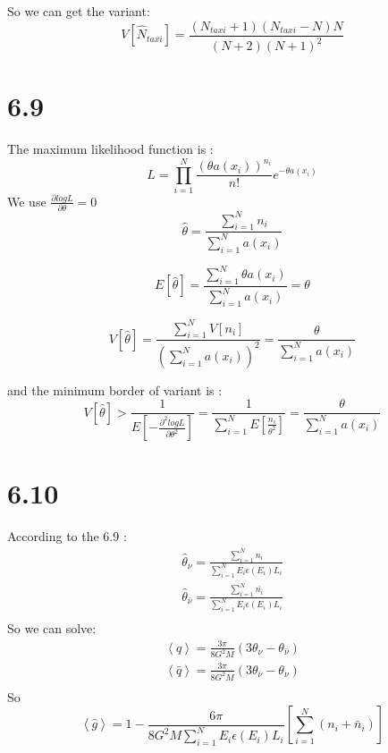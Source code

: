 \documentclass{article}
\begin{document}
\begin{CJK*}{GBK}{song}
 So we can get the variant:
 \begin{equation}
 V[\hat{N}_{taxi}]=\frac{(N_{taxi}+1)(N_{taxi}-N)N}{(N+2)(N+1)^2}
 \end{equation}
 
 
 
 \section{6.9}
 
 The maximum likelihood function is :
 \begin{equation}
 L=\prod_{i=1}^N\frac{(\theta a(x_i))^{n_i}}{n!}e^{-\theta a(x_i)}
 \end{equation}
 We use $\frac{\partial logL}{\partial \theta}=0$
 \begin{equation}
 \hat{\theta}=\frac{\sum_{i=1}^Nn_i}{\sum_{i=1}^Na(x_i)}
 \end{equation}
 
  \begin{equation}
 E[\hat{\theta}]=\frac{\sum_{i=1}^N\theta a(x_i)}{\sum_{i=1}^Na(x_i)}=\theta
 \end{equation}

  \begin{equation}
 V[\hat{\theta}]=\frac{\sum_{i=1}^NV[n_i]}{(\sum_{i=1}^Na(x_i))^2}=\frac{\theta}{\sum_{i=1}^Na(x_i)}
 \end{equation}
 
 and the minimum border of variant is :
 \begin{equation}
 V[\hat{\theta}]>\frac{1}{E[-\frac{\partial^2logL}{\partial\theta^2}]}=\frac{1}{\sum_{i=1}^NE[\frac{n_i}{\theta^2}]}=\frac{\theta}{\sum_{i=1}^Na(x_i)}
 \end{equation}
 
 \section{6.10}
 According to the 6.9 :
 \begin{equation}
 \begin{aligned}
 \hat{\theta}_{\nu}=\frac{\sum_{i=1}^Nn_i}{\sum_{i=1}^NE_i\epsilon(E_i)L_i}\\
 \hat{\theta}_{\bar{\nu}}=\frac{\sum_{i=1}^N\bar{n_i}}{\sum_{i=1}^NE_i\epsilon(E_i)L_i}\\
 \end{aligned}
 \end{equation}
 So we can solve:
  \begin{equation}
 \begin{aligned}
 \left\langle q \right\rangle=\frac{3\pi}{8G^2M}(3\theta_{\nu}-\theta_{\bar{\nu}})\\
 \left\langle \bar{q} \right\rangle=\frac{3\pi}{8G^2M}(3\theta_{\bar{\nu}}-\theta_{\nu})\\
 \end{aligned}
 \end{equation}
 So 
 \begin{equation}
  \left\langle \hat{g} \right\rangle=1-\frac{6\pi}{8G^2M\sum_{i=1}^NE_i\epsilon(E_i)L_i}[\sum_{i=1}^N(n_i+\bar{n}_i)]
 \end{equation}
 

\end{CJK*}
\end{document}
